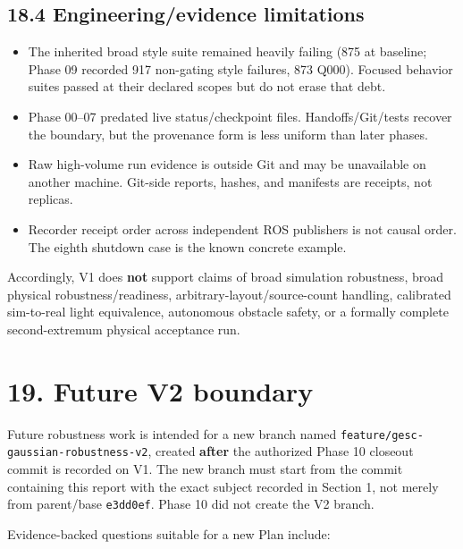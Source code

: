 \documentclass[
  10pt,
  letterpaper,
]{article}
\providecommand{\tightlist}{%
  \setlength{\itemsep}{0pt}\setlength{\parskip}{0pt}}
\begin{document}
\subsection{18.4 Engineering/evidence limitations}\label{engineeringevidence-limitations}

\begin{itemize}
\tightlist
\item
  The inherited broad style suite remained heavily failing (875 at baseline;
  Phase 09 recorded 917 non-gating style failures, 873 Q000). Focused behavior
  suites passed at their declared scopes but do not erase that debt.
\item
  Phase 00--07 predated live status/checkpoint files. Handoffs/Git/tests recover
  the boundary, but the provenance form is less uniform than later phases.
\item
  Raw high-volume run evidence is outside Git and may be unavailable on another
  machine. Git-side reports, hashes, and manifests are receipts, not replicas.
\item
  Recorder receipt order across independent ROS publishers is not causal
  order. The eighth shutdown case is the known concrete example.
\end{itemize}

Accordingly, V1 does \textbf{not} support claims of broad simulation robustness,
broad physical robustness/readiness, arbitrary-layout/source-count handling,
calibrated sim-to-real light equivalence, autonomous obstacle safety, or a
formally complete second-extremum physical acceptance run.

\section{19. Future V2 boundary}\label{future-v2-boundary}

Future robustness work is intended for a new branch named
\nolinkurl{feature/gesc-gaussian-robustness-v2}, created \textbf{after} the authorized Phase 10
closeout commit is recorded on V1. The new branch must start from the commit
containing this report with the exact subject recorded in Section 1, not merely
from parent/base \nolinkurl{e3dd0ef}. Phase 10 did not create the V2 branch.

Evidence-backed questions suitable for a new Plan include:
\end{document}
